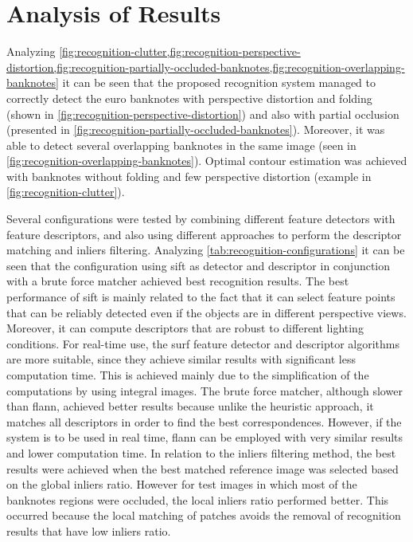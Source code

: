 \section{Analysis of Results}\label{sec:results-analysis}

Analyzing \cref{fig:recognition-clutter,fig:recognition-perspective-distortion,fig:recognition-partially-occluded-banknotes,fig:recognition-overlapping-banknotes} it can be seen that the proposed recognition system managed to correctly detect the euro banknotes with perspective distortion and folding (shown in \cref{fig:recognition-perspective-distortion}) and also with partial occlusion (presented in \cref{fig:recognition-partially-occluded-banknotes}). Moreover, it was able to detect several overlapping banknotes in the same image (seen in \cref{fig:recognition-overlapping-banknotes}). Optimal contour estimation was achieved with banknotes without folding and few perspective distortion (example in \cref{fig:recognition-clutter}).

Several configurations were tested by combining different feature detectors with feature descriptors, and also using different approaches to perform the descriptor matching and inliers filtering. Analyzing \cref{tab:recognition-configurations} it can be seen that the configuration using \gls{sift} as detector and descriptor in conjunction with a brute force matcher achieved best recognition results. The best performance of \gls{sift} is mainly related to the fact that it can select feature points that can be reliably detected even if the objects are in different perspective views. Moreover, it can compute descriptors that are robust to different lighting conditions. For real-time use, the \gls{surf} feature detector and descriptor algorithms are more suitable, since they achieve similar results with significant less computation time. This is achieved mainly due to the simplification of the computations by using integral images. The brute force matcher, although slower than \gls{flann}, achieved better results because unlike the heuristic approach, it matches all descriptors in order to find the best correspondences. However, if the system is to be used in real time, \gls{flann} can be employed with very similar results and lower computation time. In relation to the inliers filtering method, the best results were achieved when the best matched reference image was selected based on the global inliers ratio. However for test images in which most of the banknotes regions were occluded, the local inliers ratio performed better. This occurred because the local matching of patches avoids the removal of recognition results that have low inliers ratio.

